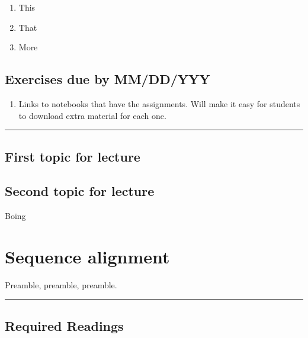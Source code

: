 \documentclass[]{book}
\providecommand{\tightlist}{%
  \setlength{\itemsep}{0pt}\setlength{\parskip}{0pt}}
\begin{document}
\begin{enumerate}
\def\labelenumi{\arabic{enumi}.}
\tightlist
\item
  This
\item
  That
\item
  More
\end{enumerate}

\hypertarget{exercises-due-by-mmddyyy-4}{%
\section*{Exercises due by MM/DD/YYY}\label{exercises-due-by-mmddyyy-4}}

\begin{enumerate}
\def\labelenumi{\arabic{enumi}.}
\tightlist
\item
  Links to notebooks that have the assignments. Will make it
  easy for students to download extra material for each one.
\end{enumerate}

\begin{center}\rule{0.5\linewidth}{\linethickness}\end{center}

\hypertarget{first-topic-for-lecture-4}{%
\section{First topic for lecture}\label{first-topic-for-lecture-4}}

\hypertarget{second-topic-for-lecture-4}{%
\section{Second topic for lecture}\label{second-topic-for-lecture-4}}

Boing

\hypertarget{sequence-alignment}{%
\chapter{Sequence alignment}\label{sequence-alignment}}

Preamble, preamble, preamble.

\begin{center}\rule{0.5\linewidth}{\linethickness}\end{center}

\hypertarget{required-readings-5}{%
\section*{Required Readings}\label{required-readings-5}}
\end{document}
